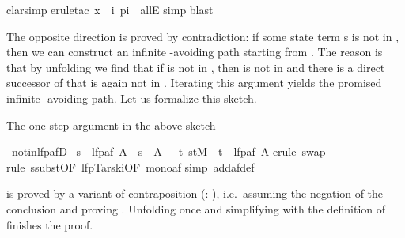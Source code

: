 \begin{isabellebody}
clarsimp{\isacharparenright}\isanewline
{}erule{\isacharunderscore}tac\ x\ {\isacharequal}\ {\isachardoublequote}{\isasymlambda}i{\isachardot}\ p{\isacharparenleft}i{\isacharplus}\ \ allE{\isacharparenright}\isanewline
{}simp{\isacharparenright}\isanewline
{}blast{\isacharparenright}%
\begin{isamarkuptext}%
The opposite direction is proved by contradiction: if some state
{term s} is not in , then we can construct an
infinite -avoiding path starting from . The reason is
that by unfolding  we find that if  is not in
, then  is not in  and there is a
direct successor of  that is again not in . Iterating this argument yields the promised infinite
-avoiding path. Let us formalize this sketch.

The one-step argument in the above sketch%
\end{isamarkuptext}%
\ not{\isacharunderscore}in{\isacharunderscore}lfp{\isacharunderscore}afD{\isacharcolon}\isanewline
\ {\isachardoublequote}s\ {\isasymnotin}\ lfp{\isacharparenleft}af\ A{\isacharparenright}\ {\isasymLongrightarrow}\ s\ {\isasymnotin}\ A\ {\isasymand}\ {\isacharparenleft}{\isasymexists}\ t{\isachardot}\ {\isacharparenleft}s{\isacharcomma}t{\isacharparenright}{\isasymin}M\ {\isasymand}\ t\ {\isasymnotin}\ lfp{\isacharparenleft}af\ A{\isacharparenright}{\isacharparenright}{\isachardoublequote}\isanewline
{}erule\ swap{\isacharparenright}\isanewline
{}rule\ ssubst{\isacharbrackleft}OF\ lfp{\isacharunderscore}Tarski{\isacharbrackleft}OF\ mono{\isacharunderscore}af{\isacharbrackright}{\isacharbrackright}{\isacharparenright}\isanewline
{}simp\ add{\isacharcolon}af{\isacharunderscore}def{\isacharparenright}%
\begin{isamarkuptext}%
\noindent
is proved by a variant of contraposition (:
), i.e.\ assuming the negation of the conclusion
and proving . Unfolding  once and
simplifying with the definition of  finishes the proof.


\end{isamarkuptext}
\end{isabellebody}
